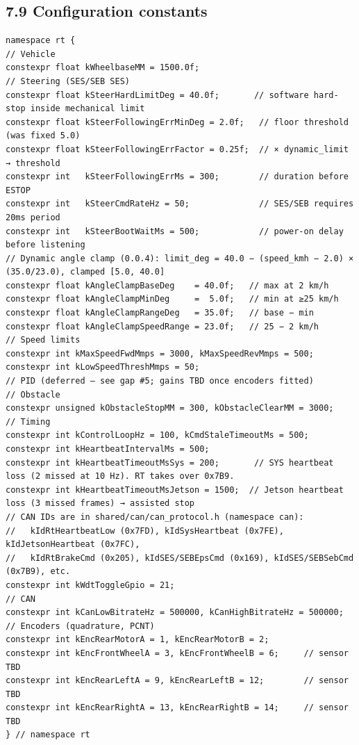 \documentclass[12pt,a4paper,oneside]{report}
\begin{document}
\subsection{7.9 Configuration constants}\label{configuration-constants}

\begin{verbatim}
namespace rt {
// Vehicle
constexpr float kWheelbaseMM = 1500.0f;
// Steering (SES/SEB SES)
constexpr float kSteerHardLimitDeg = 40.0f;       // software hard-stop inside mechanical limit
constexpr float kSteerFollowingErrMinDeg = 2.0f;   // floor threshold (was fixed 5.0)
constexpr float kSteerFollowingErrFactor = 0.25f;  // × dynamic_limit → threshold
constexpr int   kSteerFollowingErrMs = 300;        // duration before ESTOP
constexpr int   kSteerCmdRateHz = 50;              // SES/SEB requires 20ms period
constexpr int   kSteerBootWaitMs = 500;            // power-on delay before listening
// Dynamic angle clamp (0.0.4): limit_deg = 40.0 − (speed_kmh − 2.0) × (35.0/23.0), clamped [5.0, 40.0]
constexpr float kAngleClampBaseDeg    = 40.0f;   // max at 2 km/h
constexpr float kAngleClampMinDeg     =  5.0f;   // min at ≥25 km/h
constexpr float kAngleClampRangeDeg   = 35.0f;   // base − min
constexpr float kAngleClampSpeedRange = 23.0f;   // 25 − 2 km/h
// Speed limits
constexpr int kMaxSpeedFwdMmps = 3000, kMaxSpeedRevMmps = 500;
constexpr int kLowSpeedThreshMmps = 50;
// PID (deferred — see gap #5; gains TBD once encoders fitted)
// Obstacle
constexpr unsigned kObstacleStopMM = 300, kObstacleClearMM = 3000;
// Timing
constexpr int kControlLoopHz = 100, kCmdStaleTimeoutMs = 500;
constexpr int kHeartbeatIntervalMs = 500;
constexpr int kHeartbeatTimeoutMsSys = 200;       // SYS heartbeat loss (2 missed at 10 Hz). RT takes over 0x7B9.
constexpr int kHeartbeatTimeoutMsJetson = 1500;  // Jetson heartbeat loss (3 missed frames) → assisted stop
// CAN IDs are in shared/can/can_protocol.h (namespace can):
//   kIdRtHeartbeatLow (0x7FD), kIdSysHeartbeat (0x7FE), kIdJetsonHeartbeat (0x7FC),
//   kIdRtBrakeCmd (0x205), kIdSES/SEBEpsCmd (0x169), kIdSES/SEBSebCmd (0x7B9), etc.
constexpr int kWdtToggleGpio = 21;
// CAN
constexpr int kCanLowBitrateHz = 500000, kCanHighBitrateHz = 500000;
// Encoders (quadrature, PCNT)
constexpr int kEncRearMotorA = 1, kEncRearMotorB = 2;
constexpr int kEncFrontWheelA = 3, kEncFrontWheelB = 6;     // sensor TBD
constexpr int kEncRearLeftA = 9, kEncRearLeftB = 12;        // sensor TBD
constexpr int kEncRearRightA = 13, kEncRearRightB = 14;     // sensor TBD
} // namespace rt
\end{verbatim}
\end{document}
